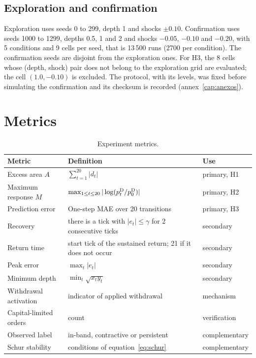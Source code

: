\subsection{Exploration and confirmation}

Exploration uses seeds 0 to 299, depth 1 and shocks $\pm0.10$. Confirmation uses seeds 1000 to 1299, depths 0.5, 1 and 2 and shocks $-0.05$, $-0.10$ and $-0.20$, with 5 conditions and 9 cells per seed, that is 13\,500 runs (2700 per condition). The confirmation seeds are disjoint from the exploration ones. For H3, the 8 cells whose (depth, shock) pair does not belong to the exploration grid are evaluated; the cell $(1.0,-0.10)$ is excluded. The protocol, with its levels, was fixed before simulating the confirmation and its checksum is recorded (annex~\ref{cap:anexos}).

\section{Metrics}

\begin{table}[htbp]
\centering
\caption{Experiment metrics.}
\label{tab:metricas}
\small
\begin{tabularx}{\textwidth}{@{}l >{\raggedright\arraybackslash}X l@{}}
\toprule
Metric & Definition & Use \\
\midrule
Excess area $A$ & $\sum_{t=1}^{20}|d_t|$ & primary, H1 \\
Maximum response $M$ & $\max_{1\le t\le 20}|\log(p^{\mathrm{D}}_t/p^{\mathrm{D}}_0)|$ & primary, H2 \\
Prediction error & One-step MAE over 20 transitions & primary, H3 \\
Recovery & there is a tick with $|e_t|\le\gamma$ for 2 consecutive ticks & secondary \\
Return time & start tick of the sustained return; 21 if it does not occur & secondary \\
Peak error & $\max_t|e_t|$ & secondary \\
Minimum depth & $\min_t\sqrt{x_ty_t}$ & secondary \\
Withdrawal activation & indicator of applied withdrawal & mechanism \\
Capital-limited orders & count & verification \\
Observed label & in-band, contractive or persistent & complementary \\
Schur stability & conditions of equation~\eqref{eq:schur} & complementary \\
\bottomrule
\end{tabularx}
\end{table}

